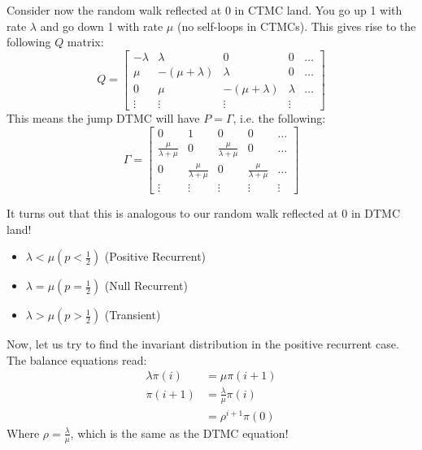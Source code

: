 \begin{example}
    Consider now the random walk reflected at 0 in CTMC land. You go up 1 with rate $\lambda$ and go down 1 with rate $\mu$ (no self-loops in CTMCs). This gives rise to the following
    $Q$ matrix:
    \[ Q = \begin{bmatrix}
        -\lambda & \lambda & 0 & 0 & \dots \\
        \mu & -(\mu + \lambda) & \lambda & 0 & \dots \\
        0 & \mu & -(\mu + \lambda) & \lambda & \dots \\
        \vdots & \vdots & \vdots & \vdots
    \end{bmatrix}\]
    This means the jump DTMC will have $P = \Gamma$, i.e. the following:
    \[ \Gamma = \begin{bmatrix}
        0 & 1 & 0 & 0 & \dots \\
        \frac{\mu}{\lambda + \mu} & 0 & \frac{\mu}{\lambda + \mu} & 0 & \dots \\
        0 & \frac{\mu}{\lambda + \mu} & 0 & \frac{\mu}{\lambda + \mu} & \dots \\
        \vdots & \vdots & \vdots & \vdots & \vdots
    \end{bmatrix} \]

    It turns out that this is analogous to our random walk reflected at 0 in DTMC land!
    \begin{itemize}
        \item $\lambda < \mu (p < \frac{1}{2})$ (Positive Recurrent)
        \item $\lambda = \mu (p = \frac{1}{2})$ (Null Recurrent)
        \item $\lambda > \mu (p > \frac{1}{2})$ (Transient)
    \end{itemize}
    Now, let us try to find the invariant distribution in the positive recurrent case. The balance equations read:
    \begin{align*}
        \lambda \pi(i) &= \mu \pi(i + 1) \\
        \pi(i + 1) &= \frac{\lambda}{\mu} \pi(i) \\
        &= \rho^{i + 1} \pi(0)
    \end{align*}
    Where $\rho = \frac{\lambda}{\mu}$, which is the same as the DTMC equation!
\end{example}
